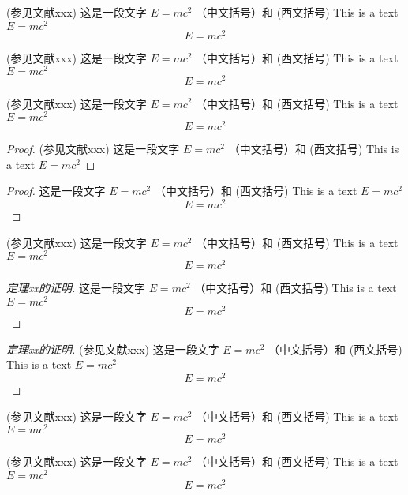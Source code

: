 \begin{definition}
  (参见文献xxx) 这是一段文字 $E = m c^2$  （中文括号）和 (西文括号) 
  This is a text $E = m c^2$
  \[
    E = m c^2
  \]
\end{definition}

\begin{definition}[测度 measure]
  (参见文献xxx) 这是一段文字 $E = m c^2$  （中文括号）和 (西文括号) 
  This is a text $E = m c^2$
  \[
    E = m c^2
  \]
\end{definition}

\begin{theorem}
  (参见文献xxx) 这是一段文字 $E = m c^2$  （中文括号）和 (西文括号) 
  This is a text $E = m c^2$
  \[
    E = m c^2
  \]
\end{theorem}

\begin{proof}
  (参见文献xxx) 这是一段文字 $E = m c^2$  （中文括号）和 (西文括号) 
  This is a text $E = m c^2$
\end{proof}

\begin{proof}
  这是一段文字 $E = m c^2$  （中文括号）和 (西文括号) 
  This is a text $E = m c^2$
  \[
    E = m c^2
  \]
\end{proof}

\begin{theorem}[测度 measure]
  (参见文献xxx) 这是一段文字 $E = m c^2$  （中文括号）和 (西文括号) 
  This is a text $E = m c^2$
  \[
    E = m c^2
  \]
\end{theorem}

\begin{proof}[定理xx的证明]
 这是一段文字 $E = m c^2$  （中文括号）和 (西文括号) 
  This is a text $E = m c^2$
  \[
    E = m c^2
  \]
\end{proof}

\begin{proof}[定理xx的证明]
  (参见文献xxx) 这是一段文字 $E = m c^2$  （中文括号）和 (西文括号) 
  This is a text $E = m c^2$
  \[
    E = m c^2
  \]
\end{proof}

\begin{example}
  (参见文献xxx) 这是一段文字 $E = m c^2$  （中文括号）和 (西文括号) 
  This is a text $E = m c^2$
  \[
    E = m c^2
  \]
\end{example}

\begin{example}[测度 measure]
  (参见文献xxx) 这是一段文字 $E = m c^2$  （中文括号）和 (西文括号) 
  This is a text $E = m c^2$
  \[
    E = m c^2
  \]
\end{example}


